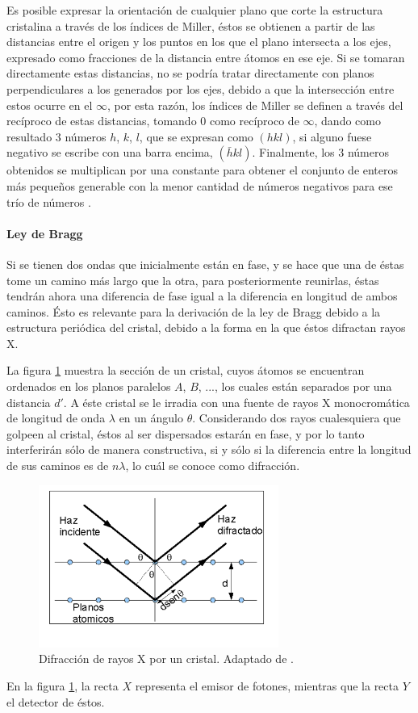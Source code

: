 \documentclass[../main.tex]{subfiles}
\begin{document}
Es posible expresar la orientación de cualquier plano que corte la estructura cristalina a través de los índices de Miller, éstos se obtienen a partir de las distancias entre el origen y los puntos en los que el plano intersecta a los ejes, expresado como fracciones de la distancia entre átomos en ese eje. Si se tomaran directamente estas distancias, no se podría tratar directamente con planos perpendiculares a los generados por los ejes, debido a que la intersección entre estos ocurre en el $\infty$, por esta razón, los índices de Miller se definen a través del recíproco de estas distancias, tomando 0 como recíproco de $\infty$, dando como resultado 3 números $h$, $k$, $l$, que se expresan como $(hkl)$, si alguno fuese negativo se escribe con una barra encima, $\left(\bar{h}kl\right)$. Finalmente, los 3 números obtenidos se multiplican por una constante para obtener el conjunto de enteros más pequeños generable con la menor cantidad de números negativos para ese trío de números \cite{Cullity2014}.
\paragraph{Ley de Bragg}
Si se tienen dos ondas que inicialmente están en fase, y se hace que una de éstas tome un camino más largo que la otra, para posteriormente reunirlas, éstas tendrán ahora una diferencia de fase igual a la diferencia en longitud de ambos caminos. Ésto es relevante para la derivación de la ley de Bragg debido a la estructura periódica del cristal, debido a la forma en la que éstos difractan rayos X.

La figura \ref{fig:braggdiag} muestra la sección de un cristal, cuyos átomos se encuentran ordenados en los planos paralelos $A$, $B$, ..., los cuales están separados por una distancia $d'$. A éste cristal se le irradia con una fuente de rayos X monocromática de longitud de onda $\lambda$ en un ángulo $\theta$. Considerando dos rayos cualesquiera que golpeen al cristal, éstos al ser dispersados estarán en fase, y por lo tanto interferirán sólo de manera constructiva, si y sólo si la diferencia entre la longitud de sus caminos es de $n\lambda$, lo cuál se conoce como difracción.
\begin{figure}[H]
    \centering
    \includegraphics[width=0.7\textwidth]{fig/braggdiag.png}
    \caption{Difracción de rayos X por un cristal. Adaptado de \cite{Cullity2014}.}
    \label{fig:braggdiag}
\end{figure}
En la figura \ref{fig:braggdiag}, la recta $X$ representa el emisor de fotones, mientras que la recta $Y$ el detector de éstos.
\end{document}
